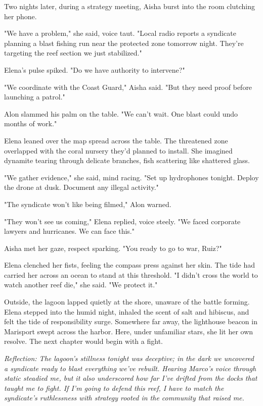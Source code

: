 \bigskip

Two nights later, during a strategy meeting, Aisha burst into the room clutching her phone.

"We have a problem," she said, voice taut. "Local radio reports a syndicate planning a blast fishing run near the protected zone tomorrow night. They're targeting the reef section we just stabilized."

Elena's pulse spiked. "Do we have authority to intervene?"

"We coordinate with the Coast Guard," Aisha said. "But they need proof before launching a patrol."

Alon slammed his palm on the table. "We can't wait. One blast could undo months of work."

Elena leaned over the map spread across the table. The threatened zone overlapped with the coral nursery they'd planned to install. She imagined dynamite tearing through delicate branches, fish scattering like shattered glass.

"We gather evidence," she said, mind racing. "Set up hydrophones tonight. Deploy the drone at dusk. Document any illegal activity."

"The syndicate won't like being filmed," Alon warned.

"They won't see us coming," Elena replied, voice steely. "We faced corporate lawyers and hurricanes. We can face this."

Aisha met her gaze, respect sparking. "You ready to go to war, Ruiz?"

Elena clenched her fists, feeling the compass press against her skin. The tide had carried her across an ocean to stand at this threshold. "I didn't cross the world to watch another reef die," she said. "We protect it."

Outside, the lagoon lapped quietly at the shore, unaware of the battle forming. Elena stepped into the humid night, inhaled the scent of salt and hibiscus, and felt the tide of responsibility surge. Somewhere far away, the lighthouse beacon in Marisport swept across the harbor. Here, under unfamiliar stars, she lit her own resolve. The next chapter would begin with a fight.

\noindent\textit{Reflection: The lagoon's stillness tonight was deceptive; in the dark we uncovered a syndicate ready to blast everything we've rebuilt. Hearing Marco's voice through static steadied me, but it also underscored how far I've drifted from the docks that taught me to fight. If I'm going to defend this reef, I have to match the syndicate's ruthlessness with strategy rooted in the community that raised me.}
